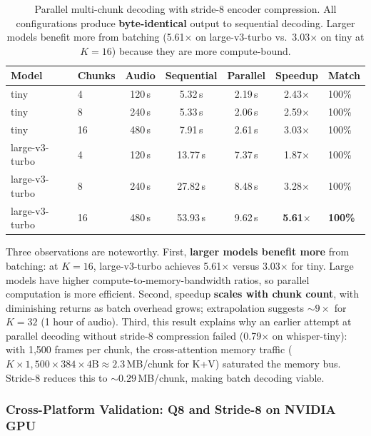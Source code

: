 \documentclass[11pt,a4paper]{article}
\begin{document}
\begin{table}[H]
\centering
\small
\begin{tabular}{@{}llccccl@{}}
\toprule
\textbf{Model} & \textbf{Chunks} & \textbf{Audio} & \textbf{Sequential} & \textbf{Parallel} & \textbf{Speedup} & \textbf{Match} \\
\midrule
tiny & 4 & 120\,s & 5.32\,s & 2.19\,s & 2.43$\times$ & 100\% \\
tiny & 8 & 240\,s & 5.33\,s & 2.06\,s & 2.59$\times$ & 100\% \\
tiny & 16 & 480\,s & 7.91\,s & 2.61\,s & 3.03$\times$ & 100\% \\
large-v3-turbo & 4 & 120\,s & 13.77\,s & 7.37\,s & 1.87$\times$ & 100\% \\
large-v3-turbo & 8 & 240\,s & 27.82\,s & 8.48\,s & 3.28$\times$ & 100\% \\
large-v3-turbo & 16 & 480\,s & 53.93\,s & 9.62\,s & \textbf{5.61$\times$} & \textbf{100\%} \\
\bottomrule
\end{tabular}
\caption{Parallel multi-chunk decoding with stride-8 encoder compression. All configurations produce \textbf{byte-identical} output to sequential decoding. Larger models benefit more from batching (5.61$\times$ on large-v3-turbo vs.\ 3.03$\times$ on tiny at $K=16$) because they are more compute-bound.}
\label{tab:parallel}
\end{table}

Three observations are noteworthy. First, \textbf{larger models benefit more} from batching: at $K=16$, large-v3-turbo achieves 5.61$\times$ versus 3.03$\times$ for tiny. Large models have higher compute-to-memory-bandwidth ratios, so parallel computation is more efficient. Second, speedup \textbf{scales with chunk count}, with diminishing returns as batch overhead grows; extrapolation suggests ${\sim}9\times$ for $K=32$ (1 hour of audio). Third, this result explains why an earlier attempt at parallel decoding without stride-8 compression failed (0.79$\times$ on whisper-tiny): with 1,500 frames per chunk, the cross-attention memory traffic ($K \times 1{,}500 \times 384 \times 4\text{B} \approx 2.3$\,MB/chunk for K+V) saturated the memory bus. Stride-8 reduces this to ${\sim}0.29$\,MB/chunk, making batch decoding viable.

\subsubsection{Cross-Platform Validation: Q8 and Stride-8 on NVIDIA GPU}
\label{sec:gpu_validation}
\end{document}
